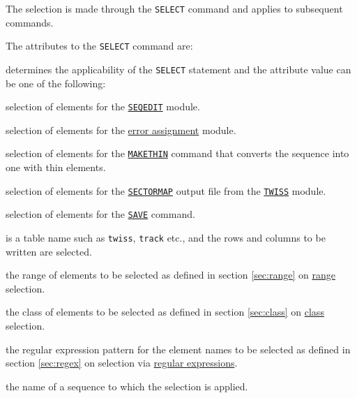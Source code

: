 The selection is made through the {\tt SELECT} command and applies to
subsequent commands.


The attributes to the {\tt SELECT} command are:
\begin{madlist}
   determines the applicability of the
         {\tt SELECT} statement and the attribute value can be one of
         the following:
     \begin{madlist}
        selection of elements for the
       \hyperref[sec:seqedit]{\tt SEQEDIT} module.
       
        selection of elements for the
       \hyperref[chap:error]{error assignment} module.
       
        selection of elements for the
       \hyperref[chap:makethin]{\tt MAKETHIN} command that
       converts the sequence into one with thin elements.
       
        selection of elements for the
       \hyperref[sec:sectormap]{\tt SECTORMAP} output file
       from the \hyperref[chap:twiss]{\tt TWISS} module.
       
        selection of elements for the
       \hyperref[sec:save]{\tt SAVE} command.
       
        is a table name such as {\tt twiss}, 
       {\tt track} etc., and the rows and columns to be written are
       selected.
     \end{madlist} 
     
   the range of elements to be selected as defined in
  section \ref{sec:range} on \hyperref[sec:range]{range} selection.

   the class of elements to be selected as defined in
  section \ref{sec:class} on \hyperref[sec:class]{class} selection.

   the regular expression pattern for the element names
  to be selected as defined in section \ref{sec:regex} on selection via
  \hyperref[sec:regex]{regular expressions}. 

   the name of a sequence to which the selection is applied.


\end{madlist}
